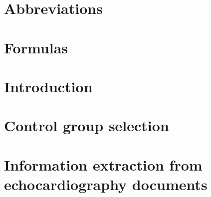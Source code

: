 \documentclass[12pt, a4paper, twoside]{report}
\makeatletter
\def\cleardoublepage{\clearpage\if@twoside \ifodd\c@page\else
    \hbox{}
    \thispagestyle{empty}
    \newpage
    \if@twocolumn\hbox{}\newpage\fi\fi\fi}
\makeatother
\begin{document}
\DeclarePairedDelimiter\abs{\lvert}{\rvert}
\DeclarePairedDelimiter\norm{\lVert}{\rVert}






\cleardoublepage


\cleardoublepage


\cleardoublepage


\cleardoublepage



\tableofcontents
\cleardoublepage

\listoffigures
\cleardoublepage

\listoftables
\cleardoublepage

\listofalgorithms

\chapter*{Abbreviations}
\label{chap:abbreviations}


\chapter*{Formulas}
\label{chap:formulas}

\cleardoublepage



\chapter{Introduction}
\label{chap:introduction}

\cleardoublepage

\chapter{Control group selection}
\label{chap:control_group_selection}

\cleardoublepage

\chapter{Information extraction from echocardiography documents}
\label{chap:text_mining}

\cleardoublepage



\cleardoublepage
\newpage\hbox{~}\thispagestyle{empty}\newpage
\cleardoublepage
\end{document}
